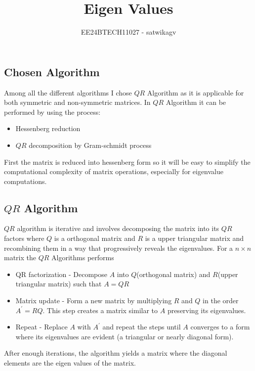 \documentclass[journal]{IEEEtran}
\begin{document}

\vspace{3cm}

\title{Eigen Values}
\author{EE24BTECH11027 - satwikagv}
{\let\newpage\relax\maketitle}

\renewcommand{\thefigure}{\theenumi}
\renewcommand{\thetable}{\theenumi}
\setlength{\intextsep}{10pt} %


\renewcommand{\thetable}{\theenumi}
\section{}
\subsection{Chosen Algorithm}
Among all the different algorithms I chose $QR$ Algorithm as it is applicable for both symmetric and non-symmetric matrices. In $QR$ Algorithm  it can be performed by using the process:
\begin{itemize}
    \item Hessenberg reduction
    \item $QR$ decomposition by Gram-schmidt process
\end{itemize}
First the matrix is reduced into hessenberg form so it will be easy to simplify the computational complexity of matrix operations, especially for eigenvalue computations. 
\subsection{$QR$ Algorithm}
$QR$ algorithm is iterative and involves decomposing the matrix into its $QR$ factors where $Q$ is a orthogonal matrix and $R$ is a upper triangular matrix and recombining them in a way that progressively reveals the eigenvalues. For a $n \times n$ matrix the $QR$ Algorithms performs 
\begin{itemize}
    \item QR factorization - Decompose $A$ into $Q$(orthogonal matrix) and $R$(upper triangular matrix) such that $A=QR$
    \item Matrix update - Form a new matrix by multiplying $R$ and $Q$ in the order $A^\prime=RQ$. This step creates a matrix similar to $A$ preserving its eigenvalues.
    \item Repeat -  Replace $A$ with $A^\prime$ and repeat the steps until $A$ converges to a form where its eigenvalues are evident (a triangular or nearly diagonal form).
\end{itemize}
After enough iterations, the algorithm yields a matrix where the diagonal elements are the eigen values of the matrix.
\end{document}
